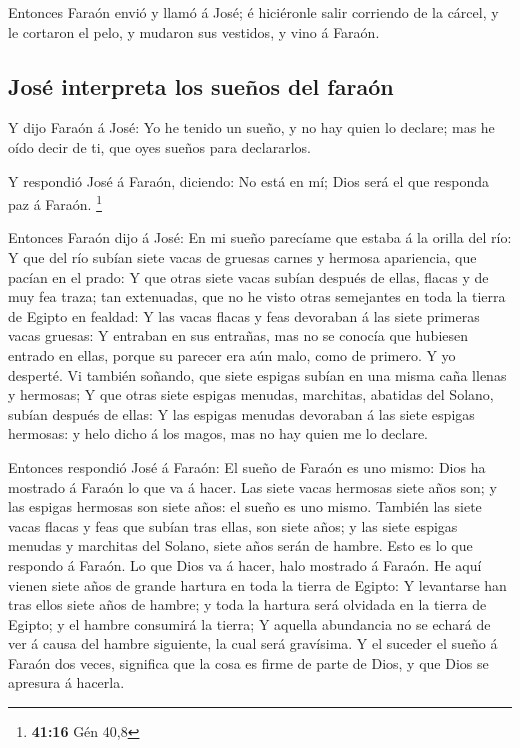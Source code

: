  Entonces Faraón envió y llamó á José; é hiciéronle salir
corriendo de la cárcel, y le cortaron el pelo, y mudaron sus vestidos, y
vino á Faraón.

\hypertarget{josuxe9-interpreta-los-sueuxf1os-del-farauxf3n}{%
\subsection{José interpreta los sueños del
faraón}\label{josuxe9-interpreta-los-sueuxf1os-del-farauxf3n}}

 Y dijo Faraón á José: Yo he tenido un sueño, y no hay
quien lo declare; mas he oído decir de ti, que oyes sueños para
declararlos.

 Y respondió José á Faraón, diciendo: No está en mí; Dios
será el que responda paz á Faraón. \footnote{\textbf{41:16} Gén 40,8}

 Entonces Faraón dijo á José: En mi sueño parecíame que
estaba á la orilla del río:  Y que del río subían siete
vacas de gruesas carnes y hermosa apariencia, que pacían en el prado:
 Y que otras siete vacas subían después de ellas, flacas
y de muy fea traza; tan extenuadas, que no he visto otras semejantes en
toda la tierra de Egipto en fealdad:  Y las vacas flacas
y feas devoraban á las siete primeras vacas gruesas:  Y
entraban en sus entrañas, mas no se conocía que hubiesen entrado en
ellas, porque su parecer era aún malo, como de primero. Y yo desperté.
 Vi también soñando, que siete espigas subían en una
misma caña llenas y hermosas;  Y que otras siete espigas
menudas, marchitas, abatidas del Solano, subían después de ellas:
 Y las espigas menudas devoraban á las siete espigas
hermosas: y helo dicho á los magos, mas no hay quien me lo declare.

 Entonces respondió José á Faraón: El sueño de Faraón es
uno mismo: Dios ha mostrado á Faraón lo que va á hacer. 
Las siete vacas hermosas siete años son; y las espigas hermosas son
siete años: el sueño es uno mismo.  También las siete
vacas flacas y feas que subían tras ellas, son siete años; y las siete
espigas menudas y marchitas del Solano, siete años serán de hambre.
 Esto es lo que respondo á Faraón. Lo que Dios va á
hacer, halo mostrado á Faraón.  He aquí vienen siete años
de grande hartura en toda la tierra de Egipto:  Y
levantarse han tras ellos siete años de hambre; y toda la hartura será
olvidada en la tierra de Egipto; y el hambre consumirá la tierra;
 Y aquella abundancia no se echará de ver á causa del
hambre siguiente, la cual será gravísima.  Y el suceder
el sueño á Faraón dos veces, significa que la cosa es firme de parte de
Dios, y que Dios se apresura á hacerla.

